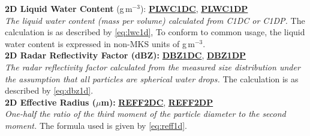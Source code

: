 \begin{hangparagraphs}
\textbf{2D Liquid Water Content} (g\,m$^{-3}$):\hypertarget{PLWC1DC}{}\hypertarget{PLWC1DP}{}\textbf{
}\textbf{\uline{PLWC1DC}},
\textbf{\uline{PLWC1DP}}\\
\emph{The liquid water content (mass
per volume) calculated from C1DC or C1DP.} The calculation is as described
by \eqref{eq:lwc1d}, To conform to common usage, the liquid water
content is expressed in non-MKS units of g\,m$^{-3}$. \\

\textbf{2D Radar Reflectivity Factor (dBZ):}\hypertarget{DBZ1DC}{}\hypertarget{DBZ1DP}{}\textbf{
}\textbf{\uline{DBZ1DC}}, \textbf{\uline{DBZ1DP}}\\
\emph{The radar reflectivity factor
calculated from the measured size distribution under the assumption
that all particles are spherical water drops. }The calculation is
as described by\emph{ }\eqref{eq:dbz1d}.\\

\textbf{2D Effective Radius ($\mu$m):}\hypertarget{REFF2DC}{}\hypertarget{REFF2DP}{}\textbf{
}\textbf{\uline{REFF2DC}},
\textbf{\uline{REFF2DP}}\\
\emph{One-half the ratio of the third moment
of the particle diameter to the second moment. }The formula used is
given by \eqref{eq:reff1d}.\label{punch:5-6}\\
 
\end{hangparagraphs}


